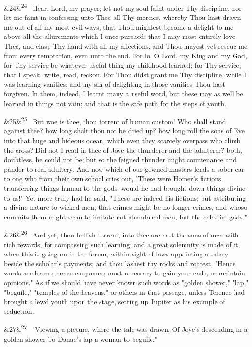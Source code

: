 \documentclass[12pt]{article}
\newcommand{\para}[1][]{\par\noindent\ifx&#1&\else\textsuperscript{\footnotesize #1}~\fi}
\begin{document}
\para[24] Hear, Lord, my prayer; let not my soul faint under Thy discipline, nor let me faint in confessing unto Thee all Thy mercies, whereby Thou hast drawn me out of all my most evil ways, that Thou mightest become a delight to me above all the allurements which I once pursued; that I may most entirely love Thee, and clasp Thy hand with all my affections, and Thou mayest yet rescue me from every temptation, even unto the end. For lo, O Lord, my King and my God, for Thy service be whatever useful thing my childhood learned; for Thy service, that I speak, write, read, reckon. For Thou didst grant me Thy discipline, while I was learning vanities; and my sin of delighting in those vanities Thou hast forgiven. In them, indeed, I learnt many a useful word, but these may as well be learned in things not vain; and that is the safe path for the steps of youth.

\para[25] But woe is thee, thou torrent of human custom! Who shall stand against thee? how long shalt thou not be dried up? how long roll the sons of Eve into that huge and hideous ocean, which even they scarcely overpass who climb the cross? Did not I read in thee of Jove the thunderer and the adulterer? both, doubtless, he could not be; but so the feigned thunder might countenance and pander to real adultery. And now which of our gowned masters lends a sober ear to one who from their own school cries out, "These were Homer's fictions, transferring things human to the gods; would he had brought down things divine to us!" Yet more truly had he said, "These are indeed his fictions; but attributing a divine nature to wicked men, that crimes might be no longer crimes, and whoso commits them might seem to imitate not abandoned men, but the celestial gods."

\para[26] And yet, thou hellish torrent, into thee are cast the sons of men with rich rewards, for compassing such learning; and a great solemnity is made of it, when this is going on in the forum, within sight of laws appointing a salary beside the scholar's payments; and thou lashest thy rocks and roarest, "Hence words are learnt; hence eloquence; most necessary to gain your ends, or maintain opinions." As if we should have never known such words as "golden shower," "lap," "beguile," "temples of the heavens," or others in that passage, unless Terence had brought a lewd youth upon the stage, setting up Jupiter as his example of seduction.

\para[27] "Viewing a picture, where the tale was drawn, Of Jove's descending in a golden shower To Danae's lap a woman to beguile."
\end{document}
